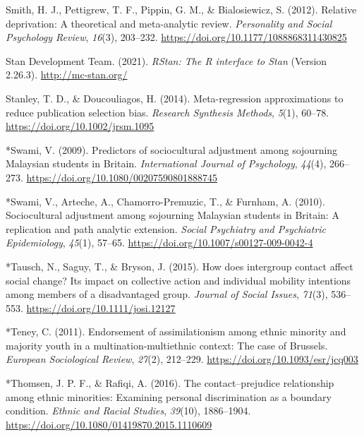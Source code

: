 \documentclass[12pt, letterpaper]{article}
\newenvironment{CSLReferences}[2]{}{}
\begin{document}
\begin{CSLReferences}{1}{0}
\leavevmode\hypertarget{ref-smith_relative_2012}{}%
Smith, H. J., Pettigrew, T. F., Pippin, G. M., \& Bialosiewicz, S.
(2012). Relative deprivation: A theoretical and meta-analytic review.
\emph{Personality and Social Psychology Review}, \emph{16}(3), 203--232.
\url{https://doi.org/10.1177/1088868311430825}

\leavevmode\hypertarget{ref-stan_development_team_rstan:_2020}{}%
Stan Development Team. (2021). \emph{{RStan}: {The} {R} interface to
{Stan}} (Version 2.26.3). \url{http://mc-stan.org/}

\leavevmode\hypertarget{ref-stanley_meta-regression_2014}{}%
Stanley, T. D., \& Doucouliagos, H. (2014). Meta-regression
approximations to reduce publication selection bias. \emph{Research
Synthesis Methods}, \emph{5}(1), 60--78.
\url{https://doi.org/10.1002/jrsm.1095}

\leavevmode\hypertarget{ref-1020}{}%
*Swami, V. (2009). Predictors of sociocultural adjustment among
sojourning {Malaysian} students in {Britain}. \emph{International
Journal of Psychology}, \emph{44}(4), 266--273.
\url{https://doi.org/10.1080/00207590801888745}

\leavevmode\hypertarget{ref-733}{}%
*Swami, V., Arteche, A., Chamorro-Premuzic, T., \& Furnham, A. (2010).
Sociocultural adjustment among sojourning {Malaysian} students in
{Britain}: A replication and path analytic extension. \emph{Social
Psychiatry and Psychiatric Epidemiology}, \emph{45}(1), 57--65.
\url{https://doi.org/10.1007/s00127-009-0042-4}

\leavevmode\hypertarget{ref-2375}{}%
*Tausch, N., Saguy, T., \& Bryson, J. (2015). How does intergroup
contact affect social change? {Its} impact on collective action and
individual mobility intentions among members of a disadvantaged group.
\emph{Journal of Social Issues}, \emph{71}(3), 536--553.
\url{https://doi.org/10.1111/josi.12127}

\leavevmode\hypertarget{ref-46}{}%
*Teney, C. (2011). Endorsement of assimilationism among ethnic minority
and majority youth in a multination-multiethnic context: {The} case of
{Brussels}. \emph{European Sociological Review}, \emph{27}(2), 212--229.
\url{https://doi.org/10.1093/esr/jcq003}

\leavevmode\hypertarget{ref-1412}{}%
*Thomsen, J. P. F., \& Rafiqi, A. (2016). The contact--prejudice
relationship among ethnic minorities: Examining personal discrimination
as a boundary condition. \emph{Ethnic and Racial Studies},
\emph{39}(10), 1886--1904.
\url{https://doi.org/10.1080/01419870.2015.1110609}


\end{CSLReferences}
\end{document}
